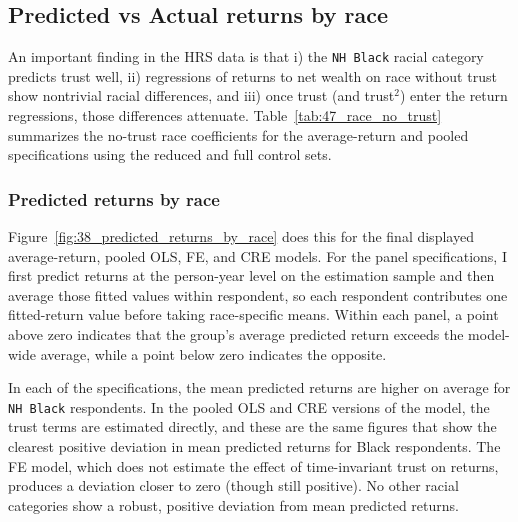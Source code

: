 \subsection{Predicted vs Actual returns by race}

\par An important finding in the HRS data is that i) the \texttt{NH Black} racial category predicts trust well, ii) regressions of returns to net wealth on race without trust show nontrivial racial differences, and iii) once trust (and trust$^2$) enter the return regressions, those differences attenuate. Table~\ref{tab:47_race_no_trust} summarizes the no-trust race coefficients for the average-return and pooled specifications using the reduced and full control sets.

\FloatBarrier

\subsubsection{Predicted returns by race}

\par Figure~\ref{fig:38_predicted_returns_by_race} does this for the final displayed average-return, pooled OLS, FE, and CRE models. For the panel specifications, I first predict returns at the person-year level on the estimation sample and then average those fitted values within respondent, so each respondent contributes one fitted-return value before taking race-specific means. Within each panel, a point above zero indicates that the group's average predicted return exceeds the model-wide average, while a point below zero indicates the opposite.

\par In each of the specifications, the mean predicted returns are higher on average for \texttt{NH Black} respondents. In the pooled OLS and CRE versions of the model, the trust terms are estimated directly, and these are the same figures that show the clearest positive deviation in mean predicted returns for Black respondents. The FE model, which does not estimate the effect of time-invariant trust on returns, produces a deviation closer to zero (though still positive). No other racial categories show a robust, positive deviation from mean predicted returns.

